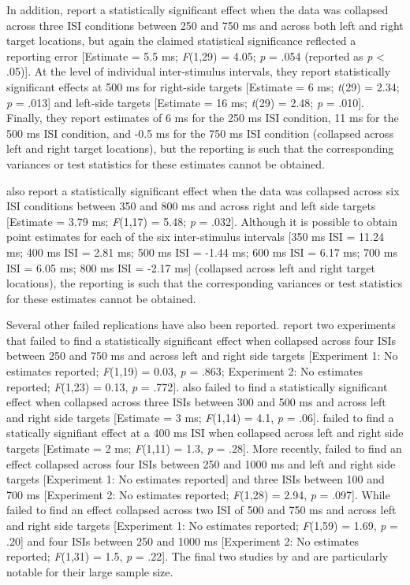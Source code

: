 \documentclass[A4paper,man,floatsintext]{apa6}
\theoremstyle{definition}
\theoremstyle{definition}
\theoremstyle{definition}
\theoremstyle{remark}
\begin{document}
In addition, \textcite{Dodd:2008dv} report a statistically significant
effect when the data was collapsed across three ISI conditions between
250 and 750 ms and across both left and right target locations, but
again the claimed statistical significance reflected a reporting error
{[}Estimate = 5.5 ms; \emph{F}(1,29) = 4.05; \emph{p} = .054 (reported
as \emph{p} \textless{} .05){]}. At the level of individual
inter-stimulus intervals, they report statistically significant effects
at 500 ms for right-side targets {[}Estimate = 6 ms; \emph{t}(29) =
2.34; \emph{p} = .013{]} and left-side targets {[}Estimate = 16 ms;
\emph{t}(29) = 2.48; \emph{p} = .010{]}. Finally, they report estimates
of 6 ms for the 250 ms ISI condition, 11 ms for the 500 ms ISI
condition, and -0.5 ms for the 750 ms ISI condition (collapsed across
left and right target locations), but the reporting is such that the
corresponding variances or test statistics for these estimates cannot be
obtained.

\textcite{Ristic:2006cr} also report a statistically significant effect
when the data was collapsed across six ISI conditions between 350 and
800 ms and across right and left side targets {[}Estimate = 3.79 ms;
\emph{F}(1,17) = 5.48; \emph{p} = .032{]}. Although it is possible to
obtain point estimates for each of the six inter-stimulus intervals
{[}350 ms ISI = 11.24 ms; 400 ms ISI = 2.81 ms; 500 ms ISI = -1.44 ms;
600 ms ISI = 6.17 ms; 700 ms ISI = 6.05 ms; 800 ms ISI = -2.17 ms{]}
(collapsed across left and right target locations), the reporting is
such that the corresponding variances or test statistics for these
estimates cannot be obtained.

Several other failed replications have also been reported.
\textcite{Zanolie:2014jr} report two experiments that failed to find a
statistically significant effect when collapsed across four ISIs between
250 and 750 ms and across left and right side targets {[}Experiment 1:
No estimates reported; \emph{F}(1,19) = 0.03, \emph{p} = .863;
Experiment 2: No estimates reported; \emph{F}(1,23) = 0.13, \emph{p} =
.772{]}. \textcite{Ranzini2009} also failed to find a statistically
significant effect when collapsed across three ISIs between 300 and 500
ms and across left and right side targets {[}Estimate = 3 ms;
\emph{F}(1,14) = 4.1, \emph{p} = .06{]}. \textcite{Salillas2008} failed
to find a statically signifiant effect at a 400 ms ISI when collapsed
across left and right side targets {[}Estimate = 2 ms; \emph{F}(1,11) =
1.3, \emph{p} = .28{]}. More recently, \textcite{vanDijck2014} failed to
find an effect collapsed across four ISIs between 250 and 1000 ms and
left and right side targets {[}Experiment 1: No estimates reported{]}
and three ISIs between 100 and 700 ms {[}Experiment 2: No estimates
reported; \emph{F}(1,28) = 2.94, \emph{p} = .097{]}. While
\textcite{Fattorini2015} failed to find an effect collapsed across two
ISI of 500 and 750 ms and across left and right side targets
{[}Experiment 1: No estimates reported; \emph{F}(1,59) = 1.69, \emph{p}
= .20{]} and four ISIs between 250 and 1000 ms {[}Experiment 2: No
estimates reported; \emph{F}(1,31) = 1.5, \emph{p} = .22{]}. The final
two studies by \textcite{vanDijck2014} and \textcite{Fattorini2015} are
particularly notable for their large sample size.
\end{document}
